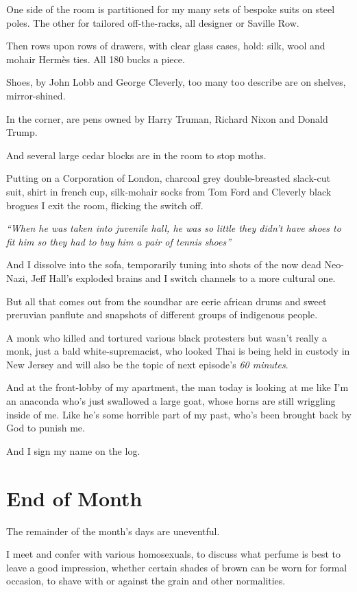 \documentclass[19pt,openany]{book}
\begin{document}
One side of the room is partitioned
for my many sets of bespoke suits
on steel poles. The
other for tailored off-the-racks, all
designer or Saville Row.

Then rows upon rows of drawers,
with clear glass cases, hold:
silk, wool and mohair Hermès ties.
All 180 bucks a piece.

Shoes, by John Lobb and
George Cleverly, too many too describe
are on shelves, mirror-shined.

In the corner, are pens
owned by Harry Truman, Richard
Nixon and Donald Trump.

And several large cedar blocks are
in the room to stop moths.

Putting on a Corporation
of London, charcoal grey
double-breasted slack-cut
suit, shirt in french
cup, silk-mohair
socks from Tom Ford and
Cleverly black brogues I
exit the room, flicking
the switch off.


\textit{``When he was taken
into juvenile hall,
he was so little they
didn't have shoes
to fit him
so they had to buy him a pair
of tennis shoes''}

And I dissolve into the sofa,
temporarily tuning into shots of the
now dead Neo-Nazi, Jeff Hall's
exploded brains and I switch
channels to a more cultural one.

But all that comes out from the soundbar
are eerie african drums and sweet preruvian panflute
and snapshots of different groups of indigenous
people.

A monk who killed and tortured various black protesters
but wasn't really a monk, just a bald
white-supremacist, who looked Thai
is being held in custody in New Jersey
and will also be the topic of next episode's
\textit{60 minutes}.

And at the front-lobby
of my apartment, the
man today is looking at me
like I'm an anaconda who's
just swallowed a large goat,
whose horns are still wriggling
inside of me. Like he's
some horrible part of my past,
who's been brought back
by God to punish me.

And I sign my name on the log.
\chapter{End of Month}

The remainder of the month's
days are uneventful.

I meet and confer with various
homosexuals, to discuss
what perfume is best to
leave a good impression,
whether certain shades of
brown can be worn for formal
occasion, to shave
with or against the grain and
other normalities.
\end{document}
